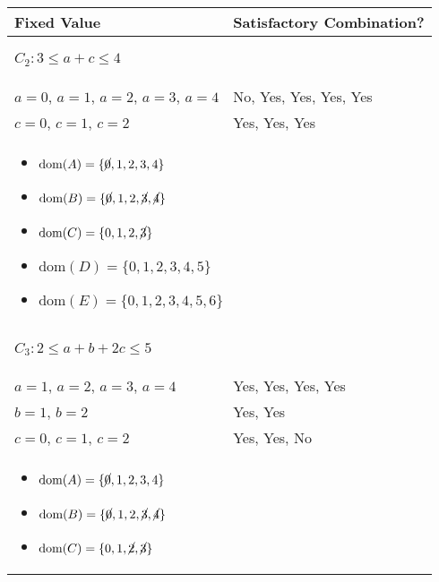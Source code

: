 \begin{example}
    \begin{center}
        \begin{tabular}{ll}
            \textbf{Fixed Value} & \textbf{Satisfactory Combination?} \\
            \toprule
            \multicolumn{2}{p{\linewidth}}{
            \begin{center}
                $C_2: 3 \leq a + c \leq 4$
            \end{center}} \\
            \midrule
                $a=0$, $a=1$, $a=2$, $a=3$, $a=4$ & No, Yes, Yes, Yes, Yes \\
                $c=0$, $c=1$, $c=2$ & Yes, Yes, Yes \\
            \multicolumn{2}{p{\linewidth}}{
            \begin{itemize}
                \item $\text{dom}(A) = \{\cancel{0}, 1, 2, 3, 4\}$
                \item $\text{dom}(B) = \{\cancel{0}, 1, 2, \cancel{3}, \cancel{4}\} $
                \item $\text{dom}(C) = \{0, 1, 2, \cancel{3}\} $
                \item $\text{dom}(D) = \{0, 1, 2, 3, 4, 5\} $
                \item $\text{dom}(E) = \{0, 1, 2, 3, 4, 5, 6\} $
            \end{itemize}} \\
            \midrule
            \multicolumn{2}{p{\linewidth}}{
            \begin{center}
                $C_3: 2 \leq a + b + 2c \leq 5$
            \end{center}} \\
            \midrule
                $a=1$, $a=2$, $a=3$, $a=4$ & Yes, Yes, Yes, Yes \\
                $b=1$, $b=2$ & Yes, Yes \\
                $c=0$, $c=1$, $c=2$ & Yes, Yes, No \\
            \multicolumn{2}{p{\linewidth}}{
            \begin{itemize}
                \item $\text{dom}(A) = \{\cancel{0}, 1, 2, 3, 4\}$
                \item $\text{dom}(B) = \{\cancel{0}, 1, 2, \cancel{3}, \cancel{4}\} $
                \item $\text{dom}(C) = \{0, 1, \cancel{2}, \cancel{3}\} $

\end{itemize}}
\end{tabular}
\end{center}
\end{example}

